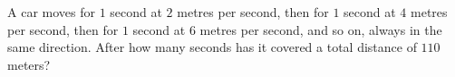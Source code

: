 A car moves for $1$ second at $2$ metres per second, then for $1$ second at $4$ metres per second, then for $1$ second at $6$ metres per second, and so on, always in the same direction. After how many seconds has it covered a total distance of $110$ meters?
